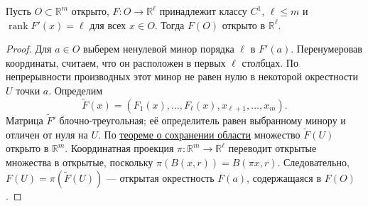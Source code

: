\label{ticket:15}

\begin{theorem}
Пусть $O\subset\mathbb R^m$ открыто, $F:O\to\mathbb R^\ell$ принадлежит классу $C^1$, $\ell\le m$ и $\operatorname{rank}F'(x)=\ell$ для всех $x\in O$.
Тогда $F(O)$ открыто в $\mathbb R^\ell$.
\end{theorem}

\begin{proof}
Для $a\in O$ выберем ненулевой минор порядка $\ell$ в $F'(a)$.
Перенумеровав координаты, считаем, что он расположен в первых $\ell$ столбцах.
По непрерывности производных этот минор не равен нулю в некоторой окрестности $U$ точки $a$.
Определим
\[
  \widetilde F(x)=(F_1(x),\ldots,F_\ell(x),x_{\ell+1},\ldots,x_m).
\]
Матрица $\widetilde F'$ блочно-треугольная; её определитель равен выбранному минору и отличен от нуля на $U$.
По \hyperref[ticket:14]{теореме о сохранении области} множество $\widetilde F(U)$ открыто в $\mathbb R^m$.
Координатная проекция $\pi:\mathbb R^m\to\mathbb R^\ell$ переводит открытые множества в открытые, поскольку $\pi(B(x,r))=B(\pi x,r)$.
Следовательно, $F(U)=\pi(\widetilde F(U))$ --- открытая окрестность $F(a)$, содержащаяся в $F(O)$.
\end{proof}
